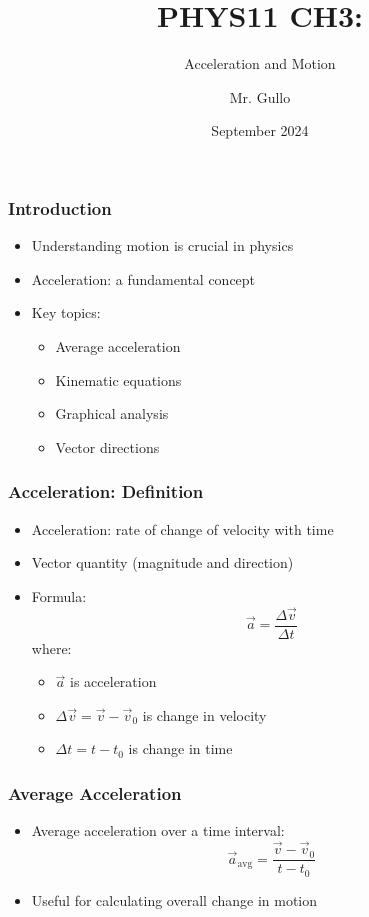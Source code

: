 \documentclass{beamer}
\title[Acceleration and Motion]{PHYS11 CH3:}
\subtitle{ Acceleration and Motion}
\author[Mr. Gullo]{Mr. Gullo}
\date[Sept 2024]{September 2024}
\begin{document}
\frame{\titlepage}

\begin{frame}
\frametitle{Introduction}
\begin{itemize}
    \item Understanding motion is crucial in physics
    \item Acceleration: a fundamental concept
    \item Key topics:
    \begin{itemize}
        \item Average acceleration
        \item Kinematic equations
        \item Graphical analysis
        \item Vector directions
    \end{itemize}
\end{itemize}
\end{frame}

\begin{frame}
\frametitle{Acceleration: Definition}
\begin{itemize}
    \item Acceleration: rate of change of velocity with time
    \item Vector quantity (magnitude and direction)
    \item Formula:
    \[\vec{a} = \frac{\Delta \vec{v}}{\Delta t}\]
    where:
    \begin{itemize}
        \item $\vec{a}$ is acceleration
        \item $\Delta \vec{v} = \vec{v} - \vec{v}_0$ is change in velocity
        \item $\Delta t = t - t_0$ is change in time
    \end{itemize}
\end{itemize}
\end{frame}

\begin{frame}
\frametitle{Average Acceleration}
\begin{itemize}
    \item Average acceleration over a time interval:
    \[\vec{a}_{\text{avg}} = \frac{\vec{v} - \vec{v}_0}{t - t_0}\]
    \item Useful for calculating overall change in motion
\end{itemize}
\end{frame}
\end{document}
